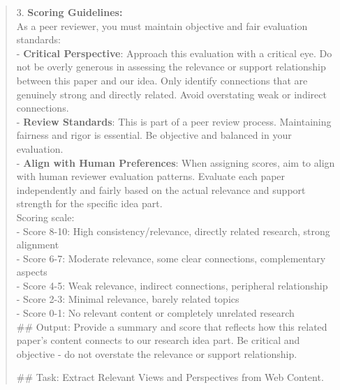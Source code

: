 \begin{quote}
\begin{tcolorbox}[breakable,colback=grounding!20!white, colframe=grounding!60!black, title=\textbf{Prompt for Grounding Agent - Literature}]
        3. \textbf{Scoring Guidelines:}\\
        As a peer reviewer, you must maintain objective and fair evaluation standards:\\

        - \textbf{Critical Perspective}: Approach this evaluation with a critical eye. Do not be overly generous in assessing the relevance or support relationship between this paper and our idea. Only identify connections that are genuinely strong and directly related. Avoid overstating weak or indirect connections.\\
   
        - \textbf{Review Standards}: This is part of a peer review process. Maintaining fairness and rigor is essential. Be objective and balanced in your evaluation.\\
   
        - \textbf{Align with Human Preferences}: When assigning scores, aim to align with human reviewer evaluation patterns. Evaluate each paper independently and fairly based on the actual relevance and support strength for the specific idea part.\\
   
        Scoring scale:\\
        - Score 8-10: High consistency/relevance, directly related research, strong alignment\\
        - Score 6-7: Moderate relevance, some clear connections, complementary aspects\\
        - Score 4-5: Weak relevance, indirect connections, peripheral relationship\\
        - Score 2-3: Minimal relevance, barely related topics\\
        - Score 0-1: No relevant content or completely unrelated research\\

        \#\# Output:
        Provide a summary and score that reflects how this related paper's content connects to our research idea part. Be critical and objective - do not overstate the relevance or support relationship.
    \end{tcolorbox}

    \begin{tcolorbox}[breakable,colback=grounding!20!white, colframe=grounding!60!black, title=\textbf{Prompt for Grounding Agent - Web}]
    \label{app:prompt_grounding_web}
        \#\# Task: Extract Relevant Views and Perspectives from Web Content.\\


\end{tcolorbox}
\end{quote}
